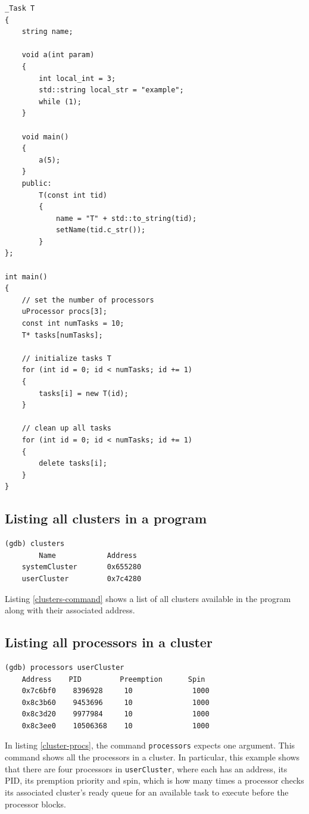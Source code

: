 \begin{lstlisting}[caption={\uCPPS source code used for GDB commands},
label={uCPP-src-code}, basicstyle=\small]
_Task T
{
    string name;

    void a(int param)
    {
        int local_int = 3;
        std::string local_str = "example";
        while (1);
    }

    void main()
    {
        a(5);
    }
    public:
        T(const int tid)
        {
            name = "T" + std::to_string(tid);
            setName(tid.c_str());
        }
};

int main()
{
    // set the number of processors
    uProcessor procs[3];
    const int numTasks = 10;
    T* tasks[numTasks];

    // initialize tasks T
    for (int id = 0; id < numTasks; id += 1)
    {
        tasks[i] = new T(id);
    }

    // clean up all tasks
    for (int id = 0; id < numTasks; id += 1)
    {
        delete tasks[i];
    }
}
\end{lstlisting}

\subsection{Listing all clusters in a \uCPPS program}
\begin{lstlisting}[caption={clusters command}, label={clusters-command}]
(gdb) clusters
        Name            Address
    systemCluster       0x655280
    userCluster         0x7c4280
\end{lstlisting}
Listing \ref{clusters-command} shows a list of all clusters available in the
program
along with their associated address.

\subsection{Listing all processors in a cluster}
\begin{lstlisting}[caption={\text{cluster\_procs} command}, label={cluster-procs}]
(gdb) processors userCluster
    Address    PID         Preemption      Spin
    0x7c6bf0    8396928     10              1000
    0x8c3b60    9453696     10              1000
    0x8c3d20    9977984     10              1000
    0x8c3ee0    10506368    10              1000
\end{lstlisting}
In listing \ref{cluster-procs}, the command \verb|processors| expects one
argument. This command shows
all the processors in a cluster. In particular, this example shows that there
are four processors in \verb|userCluster|, where each has an address,
its PID, its premption priority and spin, which is how many times a processor
checks its associated cluster's ready queue for an available task to execute
before the processor blocks.

